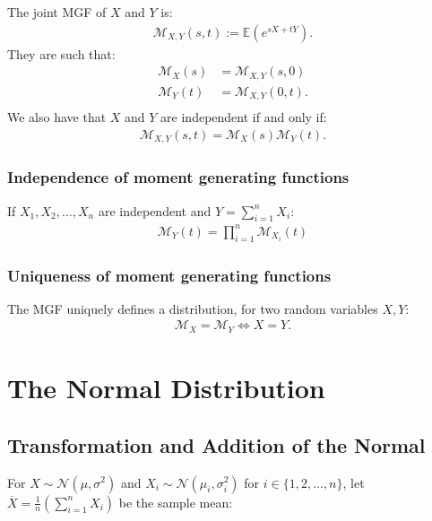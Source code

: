 \documentclass[a4paper, 12pt, twoside]{article}
\begin{document}
The joint MGF of $X$ and $Y$ is:
\begin{align*}
    \mathcal{M}_{X, Y}(s, t) := \mathbb{E}(e^{sX + tY}).
\end{align*}
They are such that:
\begin{align*}
    \mathcal{M}_X(s) & = \mathcal{M}_{X, Y}(s, 0)  \\
    \mathcal{M}_Y(t) & = \mathcal{M}_{X, Y}(0, t). \\
\end{align*}
We also have that $X$ and $Y$ are independent if and only if:
\begin{align*}
    \mathcal{M}_{X, Y}(s, t) = \mathcal{M}_X(s)\mathcal{M}_Y(t).
\end{align*}

\subsubsection{Independence of moment generating functions}

If $X_1, X_2, \ldots, X_n$ are independent and $Y = \sum_{i = 1}^n X_i$:
\begin{align*}
    \mathcal{M}_Y(t) = \prod_{i = 1}^n \mathcal{M}_{X_i}(t)
\end{align*}

\subsubsection{Uniqueness of moment generating functions}

The MGF uniquely defines a distribution, for two random variables $X, Y$:
\begin{align*}
    \mathcal{M}_X = \mathcal{M}_Y \Leftrightarrow X = Y.
\end{align*}

\newpage

\section{The Normal Distribution}

\subsection{Transformation and Addition of the Normal}

For $X \sim \mathcal{N}(\mu, \sigma^2)$ and $X_i \sim
    \mathcal{N}(\mu_i, \sigma_i^2)$ for $i \in \{1, 2, \ldots, n\}$, 
    let $\overline{X} = \frac{1}{n}(\sum_{i = 1}^n X_i)$ be the sample mean:
\end{document}
